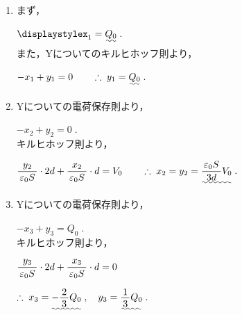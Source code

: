 ﻿\documentclass[../../../ps_a.tex]{subfiles}
\begin{document}
    \begin{enumerate}

        \item まず，
            
            \myspaceb%
            $\displaystyle%
                x_1 = \uwave{Q_0} \;.
            $\\
            また，Yについてのキルヒホッフ則より，
            
            \myspaceb%
            $\displaystyle%
                -x_1 + y_1 = 0 \qquad \therefore \; y_1 = \uwave{Q_0} \;.
            $            
        \item Yについての電荷保存則より，
            
            \myspaceb%
            $\displaystyle%
                -x_2 + y_2 = 0 \;.
            $\\
            キルヒホッフ則より，
            
            \myspaceb%
            $\displaystyle%
                \myfracc{y_2}{\varepsilon_0 S} \cdot 2d + %
                \myfracc{x_2}{\varepsilon_0 S} \cdot d = V_0%
                \qquad \therefore \; x_2 = y_2%
                = \uwave{\myfracc{\varepsilon_0 S}{3d} V_0} \;.
            $
        \item Yについての電荷保存則より，
            
            \myspaceb%
            $\displaystyle%
                -x_3 + y_3 = Q_0 \;.
            $\\
            キルヒホッフ則より，
            
            \myspaceb%
            $\displaystyle%
                \myfracc{y_3}{\varepsilon_0 S} \cdot 2d + %
                \myfracc{x_3}{\varepsilon_0 S} \cdot d = 0
            $

            \myspaceb%
            $\displaystyle%
                \therefore \; x_3 = \uwave{- \myfraca{2}{3} Q_0} \;,%
                \quad y_3 = \uwave{\myfraca{1}{3} Q_0} \;.
            $
    \end{enumerate}
\end{document}
